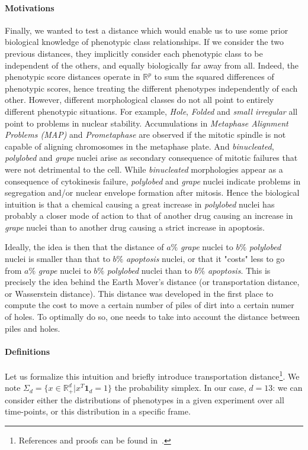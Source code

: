 \paragraph{Motivations}
Finally, we wanted to test a distance which would enable us to use
some prior biological knowledge of phenotypic class relationships. If
we consider the two previous distances, they implicitly consider each
phenotypic class to be independent of the others, and equally
biologically far away from all. Indeed, the phenotypic score distances
operate in $\mathbb{R}^p$ to sum the squared differences of phenotypic
scores, hence treating the different phenotypes independently of
each other. However, different morphological classes do not all point
to entirely different phenotypic situations. For example,
\textit{Hole}, \textit{Folded} and \textit{small irregular} all point
to problems in nuclear stability. Accumulations in \textit{Metaphase Alignment Problems
  (MAP)} and \textit{Prometaphase} are observed if the mitotic spindle
is not capable of aligning chromosomes in the metaphase plate. 
And \textit{binucleated}, \textit{polylobed} and
\textit{grape} nuclei arise as secondary consequence of mitotic
failures that were not detrimental to the cell. While
\textit{binucleated} morphologies appear as a consequence of
cytokinesis failure, \textit{polylobed} and \textit{grape} nuclei
indicate problems in segregation and/or nuclear envelope formation
after mitosis. Hence the biological intuition is that a chemical
causing a great increase in \textit{polylobed} nuclei has probably a
closer mode of action to that of another drug causing an increase in
\textit{grape} nuclei than to another drug causing
a strict increase in apoptosis. 

Ideally, the idea is then that the distance of $a\%$ \textit{grape}
nuclei to $b\%$ \textit{polylobed} nuclei is smaller than that to
$b\%$ \textit{apoptosis} nuclei, or that it "costs" less to go from
$a\%$ \textit{grape} nuclei to $b\%$ \textit{polylobed} nuclei
than to $b\%$ \textit{apoptosis}. This is precisely the idea behind
the Earth Mover's distance (or transportation distance, or Wasserstein
distance). This distance was developed in the first place to compute
the cost to move a certain number of piles of dirt into a certain
numer of holes. To optimally do so, one needs to take into account the
distance between piles and holes. 
\paragraph{Definitions}
Let us formalize this intuition and briefly introduce transportation distance\footnote{References and proofs can be found in~\cite{sinkhorn}.}. We note $\Sigma_d = \{ x \in \mathbb{R}^d_+ | x^T \mathbf{1}_d = 1\}$ the probability simplex. In our case, $d=13$: we can consider either the distributions of phenotypes in a given experiment over all time-points, or this distribution in a specific frame.

